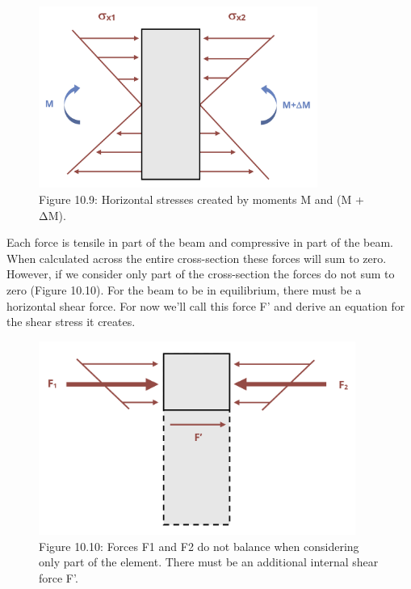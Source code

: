 \documentclass[
  letterpaper,
  DIV=11,
  numbers=noendperiod]{scrreprt}
\theoremstyle{definition}
\theoremstyle{remark}
\begin{document}
\begin{figure}[H]

{\centering \includegraphics[width=3.59375in,height=\textheight]{images/CH10 PNGs/figure 10.9.png}

}

\caption{Figure 10.9: Horizontal stresses created by moments M and (M +
ΔM).}

\end{figure}%

Each force is tensile in part of the beam and compressive in part of the
beam. When calculated across the entire cross-section these forces will
sum to zero. However, if we consider only part of the cross-section the
forces do not sum to zero (Figure 10.10). For the beam to be in
equilibrium, there must be a horizontal shear force. For now we'll call
this force F' and derive an equation for the shear stress it creates.

\begin{figure}[H]

{\centering \includegraphics[width=4.08333in,height=\textheight]{images/CH10 PNGs/figure 10.10.png}

}

\caption{Figure 10.10: Forces F1 and F2 do not balance when considering
only part of the element. There must be an additional internal shear
force F'.}

\end{figure}%
\end{document}
